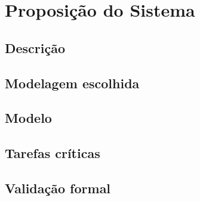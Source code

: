 \chapter{\label{chap:chap2}Proposição do Sistema}
\section{\label{sec:secao1}Descrição}
\section{\label{sec:secao2}Modelagem escolhida}
\section{\label{sec:secao3}Modelo}
\section{\label{sec:secao4}Tarefas críticas}
\section{\label{sec:secao5}Validação formal}
